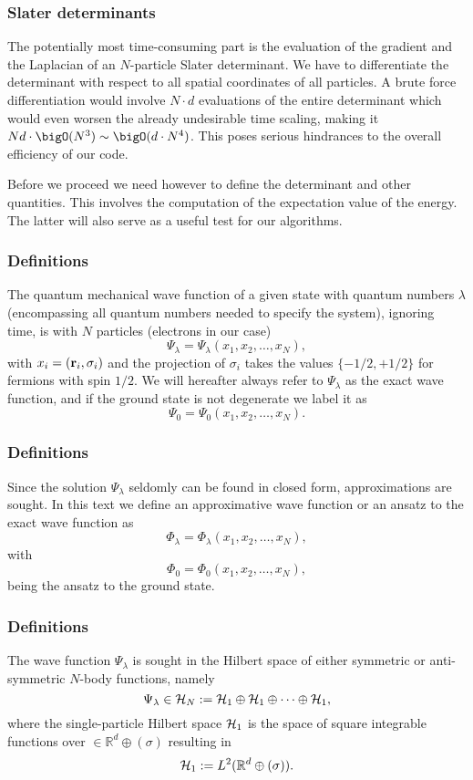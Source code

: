 \frame
{
  \frametitle{Slater determinants}
\begin{small}
{\scriptsize
The potentially most time-consuming part is the
evaluation of the gradient and the Laplacian of an $N$-particle  Slater
determinant. We have to differentiate the determinant with respect to
all spatial coordinates of all particles. A brute force
differentiation would involve $N\cdot d$ evaluations of the entire
determinant which would even worsen the already undesirable time
scaling, making it $Nd\cdot\bigO(N^3)\sim \bigO(d\cdot N^4)$.
This poses serious hindrances to the overall efficiency of our code.


Before we proceed we need however to define the determinant and other quantities. This involves the computation of the expectation value of the energy. The latter will also serve as a useful test for our algorithms.
}
\end{small}
}


\frame
{
\frametitle{Definitions}
The quantum mechanical wave function of a given state with quantum numbers $\lambda$ (encompassing all quantum numbers needed to specify the system), ignoring time, is with $N$ particles (electrons in our case)
\[
\Psi_{\lambda}=\Psi_{\lambda}(x_1,x_2,\dots,x_N),
\]
with $x_i=({\bf r}_i,\sigma_i)$ and the projection of $\sigma_i$ takes the values
$\{-1/2,+1/2\}$ for fermions with spin $1/2$. 
We will hereafter always refer to $\Psi_{\lambda}$ as the exact wave function, and if the ground state is not degenerate we label it as 
\[
\Psi_0=\Psi_0(x_1,x_2,\dots,x_N).
\]

}


\frame
{
\frametitle{Definitions}
Since the solution $\Psi_{\lambda}$ seldomly can be found in closed form, approximations are sought. In this text we define an approximative wave function or an ansatz to the exact wave function as 
\[
\Phi_{\lambda}=\Phi_{\lambda}(x_1,x_2,\dots,x_N),
\]
with 
\[
\Phi_0=\Phi_0(x_1,x_2,\dots,x_N),
\]
being the ansatz to the ground state.  
}


\frame
{
\frametitle{Definitions}
The wave function $\Psi_{\lambda}$ is sought in the Hilbert space of either symmetric or anti-symmetric $N$-body functions, namely
\[
\Psi_{\lambda}\in {\cal H}_N:= {\cal H}_1\oplus{\cal H}_1\oplus\dots\oplus{\cal H}_1,
\]
where the single-particle Hilbert space ${\cal H}_1$ is the space of square integrable functions over
$\in {\mathbb{R}}^{d}\oplus (\sigma)$
resulting in
\[
{\cal H}_1:= L^2(\mathbb{R}^{d}\oplus (\sigma)).
\]
}



